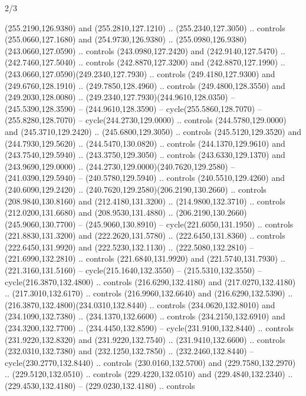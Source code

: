 \begin{flagdescription}{2/3}
\begin{scope}[xshift=0.5\flaglength,yshift=0.5\flagwidth,scale=\flagwidth/259.2]
\begin{scope}[y=0.8pt, x=0.8pt, yscale=-1,shift={(-243,-162)}]
      (255.2190,126.9380) and (255.2810,127.1210) .. (255.2340,127.3050) .. controls
      (255.0660,127.1680) and (254.9730,126.9380) ..
      (255.0980,126.9380)(243.0660,127.0590) .. controls (243.0980,127.2420) and
      (242.9140,127.5470) .. (242.7460,127.5040) .. controls (242.8870,127.3200) and
      (242.8870,127.1990) .. (243.0660,127.0590)(249.2340,127.7930) .. controls
      (249.4180,127.9300) and (249.6760,128.1910) .. (249.7850,128.4960) .. controls
      (249.4800,128.3550) and (249.2030,128.0080) ..
      (249.2340,127.7930)(244.9610,128.0350) -- (245.5390,128.3590) --
      (244.9610,128.3590) -- cycle(255.5860,128.7070) -- (255.8280,128.7070) --
      cycle(244.2730,129.0000) .. controls (244.5780,129.0000) and
      (245.3710,129.2420) .. (245.6800,129.3050) .. controls (245.5120,129.3520) and
      (244.7930,129.5620) .. (244.5470,130.0820) .. controls (244.1370,129.9610) and
      (243.7540,129.5940) .. (243.3750,129.3050) .. controls (243.6330,129.1370) and
      (243.9690,129.0000) .. (244.2730,129.0000)(240.7620,129.2580) --
      (241.0390,129.5940) -- (240.5780,129.5940) .. controls (240.5510,129.4260) and
      (240.6090,129.2420) .. (240.7620,129.2580)(206.2190,130.2660) .. controls
      (208.9840,130.8160) and (212.4180,131.3200) .. (214.9800,132.3710) .. controls
      (212.0200,131.6680) and (208.9530,131.4880) ..
      (206.2190,130.2660)(245.9060,130.7700) -- (245.9060,130.8910) --
      cycle(221.6050,131.1950) .. controls (221.8830,131.3200) and
      (222.2620,131.5780) .. (222.6450,131.8360) .. controls (222.6450,131.9920) and
      (222.5230,132.1130) .. (222.5080,132.2810) -- (221.6990,132.2810) .. controls
      (221.6840,131.9920) and (221.5740,131.7930) .. (221.3160,131.5160) --
      cycle(215.1640,132.3550) -- (215.5310,132.3550) -- cycle(216.3870,132.4800) ..
      controls (216.6290,132.4180) and (217.0270,132.4180) .. (217.3010,132.6170) ..
      controls (216.9960,132.6640) and (216.6290,132.5390) ..
      (216.3870,132.4800)(234.0310,132.8440) .. controls (234.0620,132.8010) and
      (234.1090,132.7380) .. (234.1370,132.6600) .. controls (234.2150,132.6910) and
      (234.3200,132.7700) .. (234.4450,132.8590) -- cycle(231.9100,132.8440) ..
      controls (231.9220,132.8320) and (231.9220,132.7540) .. (231.9410,132.6600) ..
      controls (232.0310,132.7380) and (232.1250,132.7850) .. (232.2460,132.8440) --
      cycle(230.2770,132.8440) .. controls (230.0160,132.5700) and
      (229.7580,132.2970) .. (229.5120,132.0510) .. controls (229.4220,132.0510) and
      (229.4840,132.2340) .. (229.4530,132.4180) -- (229.0230,132.4180) .. controls

\end{scope}
\end{scope}
\end{flagdescription}
